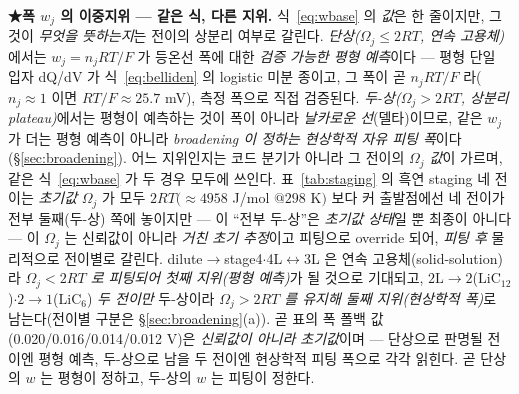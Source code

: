 \documentclass[11pt,a4paper]{article}
\begin{document}
\textbf{★폭 $w_j$ 의 이중지위 — 같은 식, 다른 지위.} 식~\eqref{eq:wbase} 의 \emph{값}은 한 줄이지만, 그것이
\emph{무엇을 뜻하는지}는 전이의 상분리 여부로 갈린다. \emph{단상($\Omega_j\le2RT$, 연속 고용체)}에서는 $w_j=n_jRT/F$
가 등온선 폭에 대한 \emph{검증 가능한 평형 예측}이다 — 평형 단일 입자 dQ/dV 가 식~\eqref{eq:belliden} 의 logistic
미분 종이고, 그 폭이 곧 $n_jRT/F$ 라($n_j\!\approx\!1$ 이면 $RT/F\!\approx\!25.7$ mV), 측정 폭으로 직접 검증된다.
\emph{두-상($\Omega_j>2RT$, 상분리 plateau)}에서는 평형이 예측하는 것이 폭이 아니라 \emph{날카로운 선}(델타)이므로,
같은 $w_j$ 가 더는 평형 예측이 아니라 \emph{broadening 이 정하는 현상학적 자유 피팅 폭}이다(\S\ref{sec:broadening}).
어느 지위인지는 코드 분기가 아니라 그 전이의 \emph{$\Omega_j$ 값}이 가르며, 같은 식~\eqref{eq:wbase} 가 두 경우 모두에
쓰인다. 표~\ref{tab:staging} 의 흑연 staging 네 전이는 \emph{초기값} $\Omega_j$ 가 모두 $2RT(\!\approx\!4958$ J/mol
$@298$ K$)$ 보다 커 출발점에선 네 전이가 전부 둘째(두-상) 쪽에 놓이지만 — 이 ``전부 두-상''은 \emph{초기값 상태}일 뿐
최종이 아니다 — 이 $\Omega_j$ 는 신뢰값이 아니라 \emph{거친 초기 추정}이고 피팅으로 override 되어, \emph{피팅 후} 물리적으로
전이별로 갈린다. dilute$\to$stage4$\cdot$4L$\leftrightarrow$3L 은
연속 고용체(solid-solution)라 \emph{$\Omega_j<2RT$ 로 피팅되어 첫째 지위(평형 예측)}가 될 것으로 기대되고,
$2\mathrm L\!\to\!2$($\mathrm{LiC_{12}}$)$\cdot$$2\!\to\!1$($\mathrm{LiC_6}$) \emph{두 전이만} 두-상이라
\emph{$\Omega_j>2RT$ 를 유지해 둘째 지위(현상학적 폭)}로 남는다(전이별 구분은 \S\ref{sec:broadening}(a)). 곧 표의 폭 폴백
값(0.020/0.016/0.014/0.012 V)은 \emph{신뢰값이 아니라 초기값}이며 — 단상으로 판명될 전이엔 평형 예측, 두-상으로 남을
두 전이엔 현상학적 피팅 폭으로 각각 읽힌다. 곧 단상의 $w$ 는 평형이 정하고, 두-상의 $w$ 는 피팅이 정한다.
\end{document}
